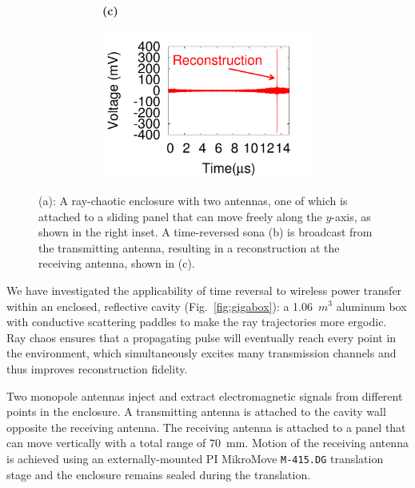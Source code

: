 \begin{figure}[]
\begin{subfigure}[]{0.9\columnwidth}
\begin{subfigure}[t]{0.45\columnwidth}
				\caption{\label{fig:sona}}
		\end{subfigure}
	\begin{subfigure}[t]{0.03\columnwidth}
	\textbf{(c)}
	\end{subfigure}
		\begin{subfigure}[t]{0.45\columnwidth}
				\centering
				\includegraphics[width=\columnwidth,valign=t]{figs/recon.pdf}
				\caption{\label{fig:recon}}
		\end{subfigure}
	\end{subfigure}
  \vspace{-1\baselineskip}
	\caption{(a): A ray-chaotic enclosure with two antennas, one of
	which is attached to a sliding panel that can move freely along the $y$-axis,
	as shown in the right inset. A time-reversed sona (b) is broadcast from the
	transmitting antenna, resulting in a reconstruction at the receiving
	antenna, shown in (c).}
	\label{fig:setup}
\vspace{-0.5\baselineskip}
\end{figure}


We have investigated the applicability of time reversal to wireless power
transfer within an enclosed, reflective cavity (Fig.~\ref{fig:gigabox}): a
1.06~$m^3$ aluminum box with conductive scattering paddles to make the ray
trajectories more ergodic.
%
Ray chaos ensures that a propagating pulse will eventually reach every point in
the environment, which simultaneously excites many transmission channels
and thus improves reconstruction fidelity.



Two monopole antennas inject and extract electromagnetic signals from different
points in the enclosure. A transmitting antenna is attached to the cavity wall
opposite the receiving antenna.
%
The receiving antenna is attached to a panel that can move vertically with a
total range of 70~mm.
%
Motion of the receiving antenna is achieved using an externally-mounted PI
MikroMove \texttt{M-415.DG} translation stage and the enclosure remains sealed
during the translation.



